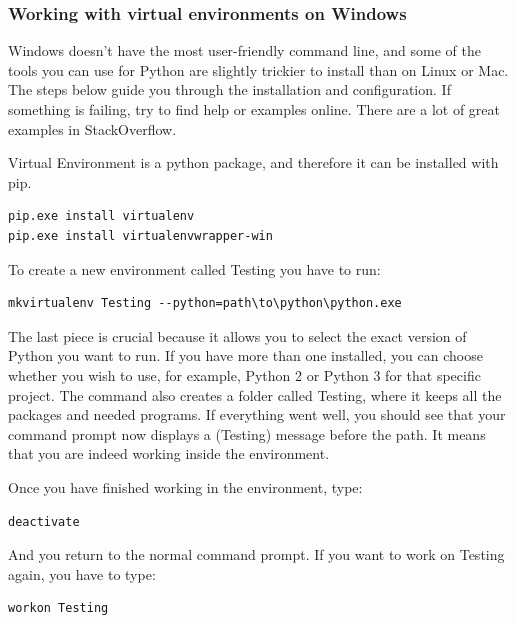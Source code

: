
\subsubsection{Working with virtual environments on Windows}
Windows doesn't have the most user-friendly command line, and some of the tools you can use for Python are slightly trickier to install than on Linux or Mac. The steps below guide you through the installation and configuration. If something is failing, try to find help or examples online. There are a lot of great examples in StackOverflow.

Virtual Environment is a python package, and therefore it can be installed with pip.

\begin{verbatim}
pip.exe install virtualenv
pip.exe install virtualenvwrapper-win
\end{verbatim}

To create a new environment called Testing you have to run:

\begin{verbatim}
mkvirtualenv Testing --python=path\to\python\python.exe
\end{verbatim}

The last piece is crucial because it allows you to select the exact version of Python you want to run. If you have more than one installed, you can choose whether you wish to use, for example, Python 2 or Python 3 for that specific project. The command also creates a folder called Testing, where it keeps all the packages and needed programs. If everything went well, you should see that your command prompt now displays a (Testing) message before the path. It means that you are indeed working inside the environment.

Once you have finished working in the environment, type:

\begin{verbatim}
deactivate
\end{verbatim}

And you return to the normal command prompt. If you want to work on Testing again, you have to type:

\begin{verbatim}
workon Testing
\end{verbatim}

